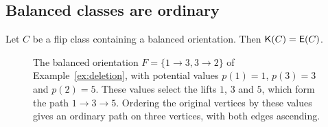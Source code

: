 \subsection{Balanced classes are ordinary}

\begin{proposition}\label{prop:balancedClass}
Let $C$ be a flip class containing a balanced orientation.
Then $\mathsf{K}(C)=\mathsf{E}(C)$.
\end{proposition}

\begin{figure}[!ht]
\centering
{}
\caption{The balanced orientation $F=\{1\to3,3\to2\}$ of
Example~\ref{ex:deletion}, with potential values $p(1)=1$, $p(3)=3$ and
$p(2)=5$.
These values select the lifts $1$, $3$ and $5$, which form the path
$1\to3\to5$.
Ordering the original vertices by these values gives an ordinary path on three
vertices, with both edges ascending.}
\label{fig:balancedLine}
\end{figure}

